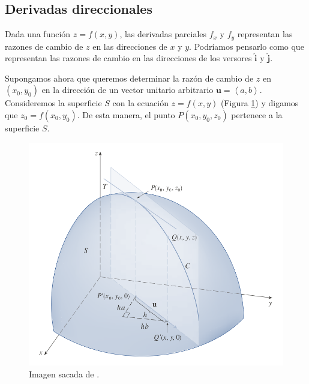 \documentclass[12pt]{article}
\begin{document}
\vspace{0.2cm}
\vspace{0.2cm}

\subsection{Derivadas direccionales}
Dada una función $ z=f(x,y) $, las derivadas parciales $ f_{x} $ y $ f_{y} $ representan las razones de cambio de $ z $ en las direcciones de $ x $ y $ y $. Podríamos pensarlo como que representan las razones de cambio en las direcciones de los versores $ \hat{\mathbf{i}} $ y $ \hat{\mathbf{j}} $.

Supongamos ahora que queremos determinar la razón de cambio de $ z $ en $ (x_{0},y_{0}) $ en la dirección de un vector unitario arbitrario $ \mathbf{u}=\left\langle a,b \right\rangle $. Consideremos la superficie $ S $ con la ecuación $ z=f(x,y) $ (Figura \ref{fig:dv-direccional}) y digamos que $ z_{0}=f(x_{0},y_{0}) $. De esta manera, el punto $ P(x_{0},y_{0},z_{0}) $ pertenece a la superficie $ S $.

\begin{figure}[H]
  \centering
  \includegraphics[width=0.6\linewidth]{imagenes/dv-direccional.png}
  \caption{Imagen sacada de \parencite{stewart2}.}
  \label{fig:dv-direccional}
\end{figure}
\end{document}
